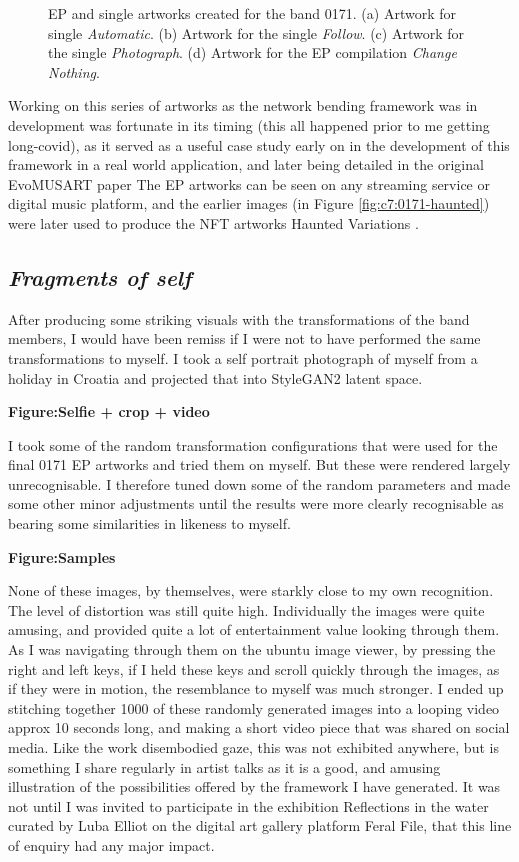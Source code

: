 \begin{figure}[!htbp]
    \caption{EP and single artworks created for the band 0171. (a) Artwork for single \textit{Automatic}. (b) Artwork for the single \textit{Follow}. (c) Artwork for the single \textit{Photograph}. (d) Artwork for the EP compilation \textit{Change Nothing}.}
    \label{fig:c7:0171-EP}
 \end{figure}

Working on this series of artworks as the network bending framework was in development was fortunate in its timing (this all happened prior to me getting long-covid), as it served as a useful case study early on in the development of this framework in a real world application, and later being detailed in the original EvoMUSART paper \citep{broad2021network} 
The EP artworks can be seen on any streaming service or digital music platform, and the earlier images (in Figure \ref{fig:c7:0171-haunted}) were later used to produce the NFT artworks Haunted Variations \citep{broad2021haunted1,broad2021haunted2}. 

\subsection{\textit{Fragments of self}}
\label{c6:subsubsec:fragments}

After producing some striking visuals with the transformations of the band members, I would have been remiss if I were not to have performed the same transformations to myself. 
I took a self portrait photograph of myself from a holiday in Croatia and projected that into StyleGAN2 latent space. 

\textbf{Figure:Selfie + crop + video}

I took some of the random transformation configurations that were used for the final 0171 EP artworks and tried them on myself. But these were rendered largely unrecognisable. 
I therefore tuned down some of the random parameters and made some other minor adjustments until the results were more clearly recognisable as bearing some similarities in likeness to myself.

\textbf{Figure:Samples}

None of these images, by themselves, were starkly close to my own recognition. 
The level of distortion was still quite high.
Individually the images were quite amusing, and provided quite a lot of entertainment value looking through them. 
As I was navigating through them on the ubuntu image viewer, by pressing the right and left keys, if I held these keys and scroll quickly through the images, as if they were in motion, the resemblance to myself was much stronger. I ended up stitching together 1000 of these randomly generated images into a looping video approx 10 seconds long, and making a short video piece that was shared on social media. 
Like the work disembodied gaze, this was not exhibited anywhere, but is something I share regularly in artist talks as it is a good, and amusing illustration of the possibilities offered by the framework I have generated. 
It was not until I was invited to participate in the exhibition Reflections in the water curated by Luba Elliot on the digital art gallery platform Feral File, that this line of enquiry had any major impact. 

